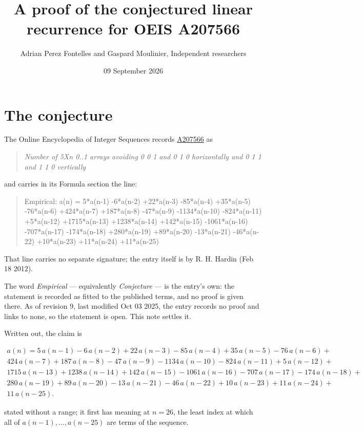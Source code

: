 \documentclass[11pt]{article}
\title{A proof of the conjectured linear recurrence for OEIS A207566}
\author{Adrian Perez Fontelles and Gaspard Moulinier, Independent researchers}
\date{09 September 2026}
\theoremstyle{definition}
\begin{document}
\maketitle
\section{The conjecture}

The Online Encyclopedia of Integer Sequences records \href{https://oeis.org/A207566}{A207566} as

\begin{quote}\itshape Number of 5Xn 0..1 arrays avoiding 0 0 1 and 0 1 0 horizontally and 0 1 1 and 1 1 0 vertically\end{quote}

and carries in its Formula section the line:

\begin{quote}\ttfamily Empirical: a(n) = 5*a(n-1) -6*a(n-2) +22*a(n-3) -85*a(n-4) +35*a(n-5) -76*a(n-6) +424*a(n-7) +187*a(n-8) -47*a(n-9) -1134*a(n-10) -824*a(n-11) +5*a(n-12) +1715*a(n-13) +1238*a(n-14) +142*a(n-15) -1061*a(n-16) -707*a(n-17) -174*a(n-18) +280*a(n-19) +89*a(n-20) -13*a(n-21) -46*a(n-22) +10*a(n-23) +11*a(n-24) +11*a(n-25)\end{quote}

That line carries no separate signature; the entry itself is by R. H. Hardin (Feb 18 2012).

The word {\itshape Empirical} --- equivalently {\itshape Conjecture} --- is the entry's own: the statement is recorded as fitted to the published terms, and no proof is given there. As of revision 9, last modified Oct 03 2025, the entry records no proof and links to none, so the statement is open. This note settles it.

Written out, the claim is

\begin{multline*} a(n) = 5\,a(n-1) - 6\,a(n-2) + 22\,a(n-3) - 85\,a(n-4) + 35\,a(n-5) - 76\,a(n-6) + \\ 424\,a(n-7) + 187\,a(n-8) - 47\,a(n-9) - 1134\,a(n-10) - 824\,a(n-11) + 5\,a(n-12) + \\ 1715\,a(n-13) + 1238\,a(n-14) + 142\,a(n-15) - 1061\,a(n-16) - 707\,a(n-17) - 174\,a(n-18) + \\ 280\,a(n-19) + 89\,a(n-20) - 13\,a(n-21) - 46\,a(n-22) + 10\,a(n-23) + 11\,a(n-24) + \\ 11\,a(n-25). \end{multline*}

stated without a range; it first has meaning at $n = 26$, the least index at which all of $a(n-1),\dots,a(n-25)$ are terms of the sequence.
\end{document}
